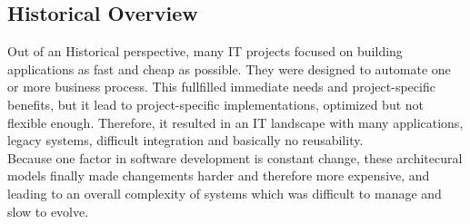 \documentclass[12pt]{article}
\begin{document}
\subsection{Historical Overview}
Out of an Historical perspective, many IT projects focused on building applications as fast and cheap as possible. They were designed to automate one or more business process. This fullfilled immediate needs and project-specific benefits, but it lead to project-specific implementations, optimized but not flexible enough. Therefore, it resulted in an IT landscape with many applications, legacy systems, difficult integration and basically no reusability. \\ Because one factor in software development is constant change, these architecural models finally made changements harder and therefore more expensive, and leading to an overall complexity of systems which was difficult to manage and slow to evolve.\cite[page 522]{grau} 
\end{document}
